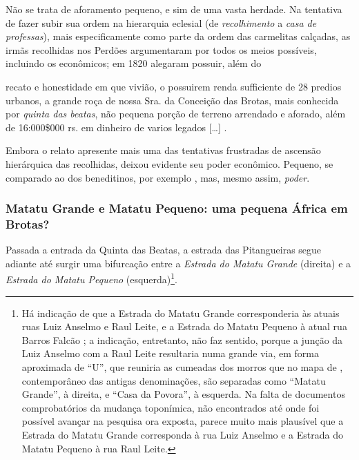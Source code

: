 Não se trata de aforamento pequeno, e sim de uma vasta herdade. Na tentativa de fazer subir sua ordem na hierarquia eclesial (de \textit{recolhimento} a \textit{casa de professas}), mais especificamente como parte da ordem das carmelitas calçadas, as irmãs recolhidas nos Perdões argumentaram por todos os meios possíveis, incluindo os econômicos; em 1820 alegaram possuir, além do 

\begin{citacao}
recato e honestidade em que vivião, o possuirem renda sufficiente de 28 predios urbanos, a grande roça de nossa Sra. da Conceição das Brotas, mais conhecida por \textit{quinta das beatas}, não pequena porção de terreno arrendado e aforado, além de 16:000\$000 rs. em dinheiro de varios legados [\dots] \cite[p.~231]{accioli_memorias5_1937}.
\end{citacao}

Embora o relato apresente mais uma das tentativas frustradas de ascensão hierárquica das recolhidas, deixou evidente seu poder econômico. Pequeno, se comparado ao dos beneditinos, por exemplo \cite{bento_tombo_1945}, mas, mesmo assim, \textit{poder}. 

\subsubsection{Matatu Grande e Matatu Pequeno: uma pequena África em Brotas?}\label{subsubsec:matatu}

Passada a entrada da Quinta das Beatas, a estrada das Pitangueiras segue adiante até surgir uma bifurcação entre a \textit{Estrada do Matatu Grande} (direita) e a \textit{Estrada do Matatu Pequeno} (esquerda)\footnote{Há indicação de que a Estrada do Matatu Grande corresponderia às atuais ruas Luiz Anselmo e Raul Leite, e a Estrada do Matatu Pequeno à atual rua Barros Falcão \cite[p.~124]{valladares_beaba_2012}; a indicação, entretanto, não faz sentido, porque a junção da Luiz Anselmo com a Raul Leite resultaria numa grande via, em forma aproximada de ``U'', que reuniria as cumeadas dos morros que no mapa de , contemporâneo das antigas denominações, são separadas como ``Matatu Grande'', à direita, e ``Casa da Povora'', à esquerda. Na falta de documentos comprobatórios da mudança toponímica, não encontrados até onde foi possível avançar na pesquisa ora exposta, parece muito mais plausível que a Estrada do Matatu Grande corresponda à rua Luiz Anselmo e a Estrada do Matatu Pequeno à rua Raul Leite.}.

